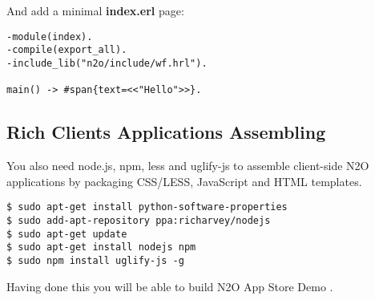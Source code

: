 And add a minimal {\bf index.erl} page:

\begin{lstlisting}[caption=index.erl]
-module(index).
-compile(export_all).
-include_lib("n2o/include/wf.hrl").

main() -> #span{text=<<"Hello">>}.
\end{lstlisting}

\subsection*{Rich Clients Applications Assembling}
You also need node.js, npm, less and uglify-js to assemble
client-side N2O applications by packaging CSS/LESS, JavaScript and HTML templates.

\vspace{1\baselineskip}
\begin{lstlisting}
$ sudo apt-get install python-software-properties
$ sudo add-apt-repository ppa:richarvey/nodejs
$ sudo apt-get update
$ sudo apt-get install nodejs npm
$ sudo npm install uglify-js -g
\end{lstlisting}
\vspace{1\baselineskip}

Having done this you will be able to build N2O App Store
Demo \newline{}.